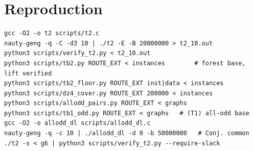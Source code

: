 \documentclass[11pt]{amsart}
\theoremstyle{definition}
\theoremstyle{remark}
\renewcommand{\_}{\oldunderscore\allowbreak}
\begin{document}
\appendix
\section{Reproduction}
\begin{verbatim}
gcc -O2 -o t2 scripts/t2.c
nauty-geng -q -C -d3 10 | ./t2 -E -B 20000000 > t2_10.out
python3 scripts/verify_t2.py < t2_10.out
python3 scripts/tb2.py ROUTE_EXT < instances        # forest base, lift verified
python3 scripts/tb2_floor.py ROUTE_EXT inst|data < instances
python3 scripts/dz4_cover.py ROUTE_EXT 200000 < instances
python3 scripts/allodd_pairs.py ROUTE_EXT < graphs
python3 scripts/tb1_odd.py ROUTE_EXT < graphs   # (T1) all-odd base
gcc -O2 -o allodd_dl scripts/allodd_dl.c
nauty-geng -q -c 10 | ./allodd_dl -d 0 -b 50000000   # Conj. common
./t2 -s < g6 | python3 scripts/verify_t2.py --require-slack
\end{verbatim}
\end{document}
